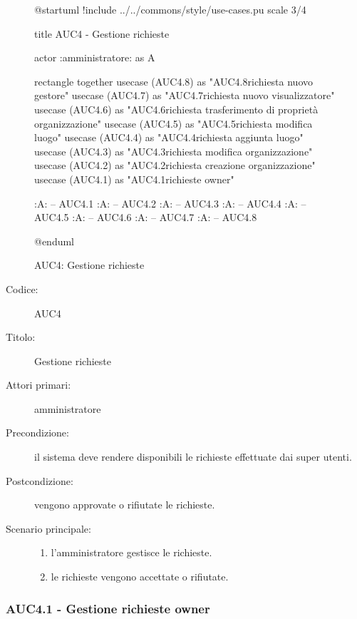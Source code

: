 \documentclass[casi-duso]{subfiles}
\begin{document}
\begin{figure}[h!] 
  \centering 
  \begin{plantuml}
  @startuml
  !include ../../commons/style/use-cases.pu
  scale 3/4

  title AUC4 - Gestione richieste

  actor :amministratore: as A

  rectangle {
    together {
      usecase (AUC4.8) as "AUC4.8\nGestione richiesta nuovo gestore"
      usecase (AUC4.7) as "AUC4.7\nGestione richiesta nuovo visualizzatore"
      usecase (AUC4.6) as "AUC4.6\nGestione richiesta trasferimento di proprietà organizzazione"
      usecase (AUC4.5) as "AUC4.5\nGestione richiesta modifica luogo"
      usecase (AUC4.4) as "AUC4.4\nGestione richiesta aggiunta luogo"
      usecase (AUC4.3) as "AUC4.3\nGestione richiesta modifica organizzazione"
      usecase (AUC4.2) as "AUC4.2\nGestione richiesta creazione organizzazione"
      usecase (AUC4.1) as "AUC4.1\nGestione richieste owner"  
    }
  }

  :A: -- AUC4.1
  :A: -- AUC4.2
  :A: -- AUC4.3
  :A: -- AUC4.4
  :A: -- AUC4.5
  :A: -- AUC4.6
  :A: -- AUC4.7
  :A: -- AUC4.8

  @enduml

  \end{plantuml} 
  \caption{AUC4: Gestione richieste} 
  \label{fig:auc4} 
\end{figure}

\begin{description}
  \item[Codice:] AUC4
  \item[Titolo:] Gestione richieste
  \item[Attori primari:] amministratore
  \item[Precondizione:] il sistema deve rendere disponibili le richieste effettuate dai super utenti.
  \item[Postcondizione:] vengono approvate o rifiutate le richieste.
  \item[Scenario principale:] 
  \begin{enumerate}
    \item l'amministratore gestisce le richieste.
    \item le richieste vengono accettate o rifiutate.
  \end{enumerate}
\end{description}

\subsubsection{AUC4.1 - Gestione richieste owner}%
\label{subsub:AUC4.1}
\end{document}
